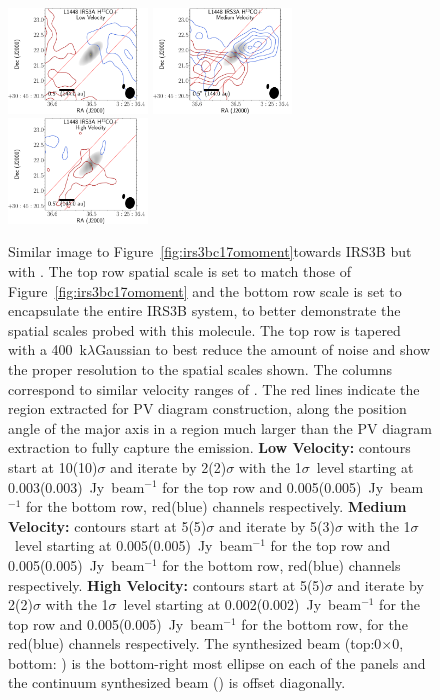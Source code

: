 \begin{figure}[H]
\begin{center} %
   \includegraphics[width=0.33\textwidth]{img/L1448IRS3B_H13COp_image_taper400k__low.pdf}
   \includegraphics[width=0.33\textwidth]{img/L1448IRS3B_H13COp_image_taper400k__medium.pdf}
   \includegraphics[width=0.33\textwidth]{img/L1448IRS3B_H13COp_image_taper400k__high.pdf}
\end{center}
   \caption{Similar image to Figure~\ref{fig:irs3bc17omoment}\space towards IRS3B but with \htcop. The top row spatial scale is set to match those of Figure~\ref{fig:irs3bc17omoment} and the bottom row scale is set to encapsulate the entire IRS3B system, to better demonstrate the spatial scales probed with this molecule. The top row is tapered with a 400~k$\lambda$\space Gaussian to best reduce the amount of noise and show the proper resolution to the spatial scales shown. The columns correspond to similar velocity ranges of \cso. The red lines indicate the region extracted for PV diagram construction, along the position angle of the major axis in a region much larger than the \cso\space PV diagram extraction to fully capture the emission. \textbf{Low Velocity:} contours start at 10(10)$\sigma$ and iterate by 2(2)$\sigma$ with the 1$\sigma$~level starting at 0.003(0.003)~Jy~beam$^{-1}$ for the top row and 0.005(0.005)~Jy~beam$^{-1}$ for the bottom row,  red(blue) channels respectively.  \textbf{Medium Velocity:}  contours start at 5(5)$\sigma$ and iterate by 5(3)$\sigma$ with the 1$\sigma$~level starting at 0.005(0.005)~Jy~beam$^{-1}$ for the top row and 0.005(0.005)~Jy~beam$^{-1}$ for the bottom row, red(blue) channels respectively. \textbf{High Velocity:} contours start at 5(5)$\sigma$ and iterate by 2(2)$\sigma$ with the 1$\sigma$~level starting at 0.002(0.002)~Jy~beam$^{-1}$ for the top row and 0.005(0.005)~Jy~beam$^{-1}$ for the bottom row, for the red(blue) channels respectively. The \htcop\space synthesized beam (top:0$\times$0, bottom: \htcopbeam) is the bottom-right most ellipse on each of the panels and the continuum synthesized beam (\contbeam) is offset diagonally.}\label{fig:h13copmomentc17o}
\end{figure}
